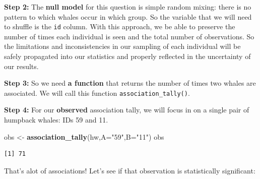 \documentclass[
]{book}
\newenvironment{Shaded}{\begin{snugshade}}{\end{snugshade}}
\newcommand{\ControlFlowTok}[1]{\textcolor[rgb]{0.13,0.29,0.53}{\textbf{#1}}}
\newcommand{\DataTypeTok}[1]{\textcolor[rgb]{0.13,0.29,0.53}{#1}}
\newcommand{\KeywordTok}[1]{\textcolor[rgb]{0.13,0.29,0.53}{\textbf{#1}}}
\newcommand{\NormalTok}[1]{#1}
\newcommand{\OperatorTok}[1]{\textcolor[rgb]{0.81,0.36,0.00}{\textbf{#1}}}
\newcommand{\StringTok}[1]{\textcolor[rgb]{0.31,0.60,0.02}{#1}}
\begin{document}
\textbf{Step 2:} The \textbf{null model} for this question is simple random mixing: there is no pattern to which whales occur in which group. So the variable that we will need to shuffle is the \texttt{id} column. With this approach, we be able to preserve the number of times each individual is seen and the total number of observations. So the limitations and inconsistencies in our sampling of each individual will be safely propagated into our statistics and properly reflected in the uncertainty of our results.

\textbf{Step 3:} So we need \textbf{a function} that returns the number of times two whales are associated. We will call this function \texttt{association\_tally()}.

\begin{Shaded}
\end{Shaded}

\textbf{Step 4:} For our \textbf{observed} association tally, we will focus in on a single pair of humpback whales: IDs 59 and 11.

\begin{Shaded}
\begin{Highlighting}[]
\NormalTok{obs <-}\StringTok{ }\KeywordTok{association_tally}\NormalTok{(hw,}\DataTypeTok{A=}\StringTok{"59"}\NormalTok{,}\DataTypeTok{B=}\StringTok{"11"}\NormalTok{)}
\NormalTok{obs}
\end{Highlighting}
\end{Shaded}

\begin{verbatim}
[1] 71
\end{verbatim}

That's alot of associations! Let's see if that observation is statistically significant:
\end{document}
